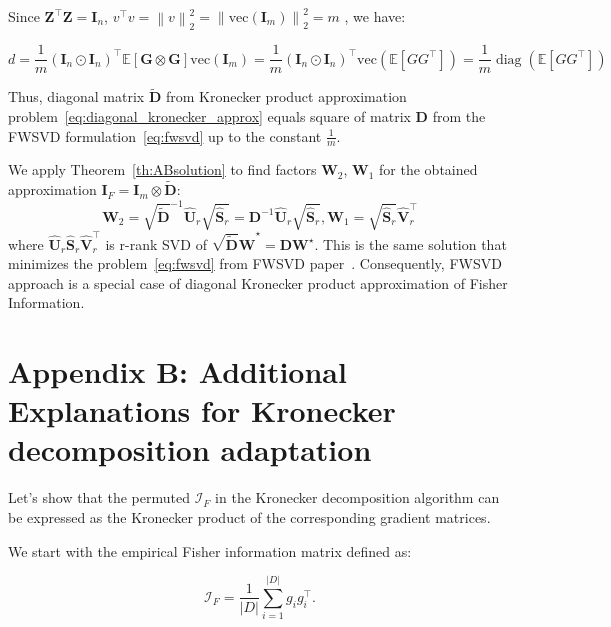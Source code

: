 \documentclass{article}
\begin{document}
Since $\mathbf{Z}^\top \mathbf{Z} = \mathbf{I}_n$, $v^\top v = \left\| v \right\|^2_2 = \left\|  \mathrm{vec}(\mathbf{I}_m) \right\|^2_2 = m$ , we have:

\begin{equation}
    d = \frac{1}{m}  (\mathbf{I}_n \odot \mathbf{I}_n)^\top \mathbb{E} [\mathbf{G} \otimes \mathbf{G}] \mathrm{vec}(\mathbf{I}_m) = \frac{1}{m}  (\mathbf{I}_n \odot \mathbf{I}_n)^\top \mathrm{vec}(\mathbb{E} [G G^\top] ) = \frac{1}{m} \operatorname{diag} (\mathbb{E} [G G^\top] )
\end{equation}

Thus, diagonal matrix $\mathbf{\tilde{D}}$ from Kronecker product approximation problem~\ref{eq:diagonal_kronecker_approx} equals square of matrix $\mathbf{D}$ from the FWSVD formulation~\ref{eq:fwsvd} up to the constant $\frac{1}{m}$.

We apply Theorem~\ref{th:ABsolution} to find factors $\mathbf{W}_2$, $\mathbf{W}_1$ for the obtained approximation $\mathbf{I}_F = \mathbf{I}_m \otimes \mathbf{\tilde{D}}$:
\begin{equation}
    \mathbf{W}_2 = \sqrt{\mathbf{\tilde{D}}}^{-1} \mathbf{\hat{U}}_r \sqrt{\mathbf{\hat{S}}_r} = \mathbf{D}^{-1} \mathbf{\hat{U}}_r \sqrt{\mathbf{\hat{S}}_r},  \mathbf{W}_1 = \sqrt{\mathbf{\hat{S}}_r} \mathbf{\hat{V}}^\top_r
\end{equation}
where  $\mathbf{\hat{U}}_r \mathbf{\hat{S}}_r \mathbf{\hat{V}}^\top_r $ is r-rank SVD of $\mathbf{\sqrt{\tilde{D}}W}^\star = \mathbf{DW}^\star$.
This is the same solution that minimizes the problem~\ref{eq:fwsvd} from FWSVD paper~\cite{FWSVD}. Consequently, FWSVD approach is a special case of diagonal Kronecker product approximation of Fisher Information.

\section{Appendix B: Additional Explanations for Kronecker decomposition adaptation}
\label{sec:appendixa}
Let's show that the permuted \( \mathcal{I}_F \) in the Kronecker decomposition algorithm can be expressed as the Kronecker product of the corresponding gradient matrices.

We start with the empirical Fisher information matrix defined as:


\begin{equation}
\mathcal{I}_F = \frac{1}{|D|}\sum_{i=1}^{|D|}{g}_{i}^{}{g}_{i}^\top.
\end{equation}
\end{document}
